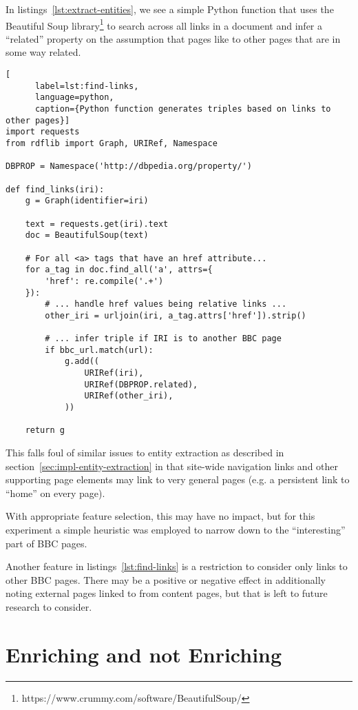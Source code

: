 In listings~\ref{lst:extract-entities}, we see a simple Python
function that uses the Beautiful Soup
library\footnote{https://www.crummy.com/software/BeautifulSoup/} to
search across all links in a document and infer a ``related''
property on the assumption that pages like to other pages that are in
some way related.

\begin{centering}
  \begin{lstlisting}[
      label=lst:find-links,
      language=python,
      caption={Python function generates triples based on links to other pages}]
import requests
from rdflib import Graph, URIRef, Namespace

DBPROP = Namespace('http://dbpedia.org/property/')
    
def find_links(iri):
    g = Graph(identifier=iri)

    text = requests.get(iri).text
    doc = BeautifulSoup(text)

    # For all <a> tags that have an href attribute...
    for a_tag in doc.find_all('a', attrs={
        'href': re.compile('.+')
    }):
        # ... handle href values being relative links ...
        other_iri = urljoin(iri, a_tag.attrs['href']).strip()

        # ... infer triple if IRI is to another BBC page
        if bbc_url.match(url):
            g.add((
                URIRef(iri),
                URIRef(DBPROP.related),
                URIRef(other_iri),
            ))

    return g
  \end{lstlisting}
\end{centering}

This falls foul of similar issues to entity extraction as described
in section~\ref{sec:impl-entity-extraction} in that site-wide
navigation links and other supporting page elements may link to
very general pages (e.g. a persistent link to ``home'' on every page).

With appropriate feature selection, this may have no impact, but for
this experiment a simple heuristic was employed to narrow down to
the ``interesting'' part of BBC pages.

Another feature in listings~\ref{lst:find-links} is a restriction
to consider only links to other BBC pages. There may be a positive
or negative effect in additionally noting external pages linked to from
content pages, but that is left to future research to consider.

\section{Enriching and not Enriching}

